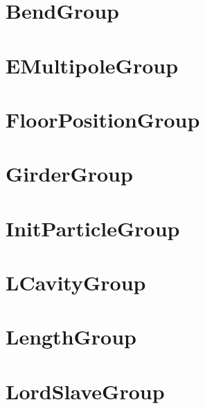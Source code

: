 \section{BendGroup}
\label{s:bend.g}

\section{EMultipoleGroup}
\label{s:emulitipole.g}

\section{FloorPositionGroup}
\label{s:floor.pos.g}

\section{GirderGroup}
\label{s:girder.g}

\section{InitParticleGroup}
\label{s:init.particle.g}

\section{LCavityGroup}
\label{s:lcavity.g}

\section{LengthGroup}
\label{s:length.g}

\section{LordSlaveGroup}
\label{s:lord.slave.g}

